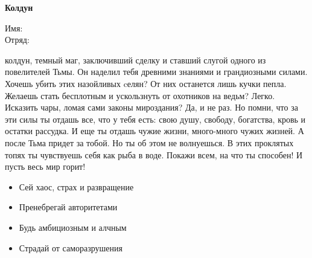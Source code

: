 \documentclass[10pt,twoside]{report}
\begin{document}
\thispagestyle{empty}
\begin{center}
{\LARGE \textbf{Колдун}}


\end{center}
\begin{description}
\item[Имя:]\hfill
\item[Отряд:]\hfill
\end{description}
\pagebreak

{ колдун, темный маг, заключивший сделку и ставший слугой одного из повелителей Тьмы. Он наделил тебя древними знаниями и грандиозными силами. Хочешь убить этих назойливых cелян? От них останется лишь кучки пепла. Желаешь стать бесплотным и ускользнуть от охотников на ведьм? Легко. Исказить чары, ломая сами законы мироздания? Да, и не раз. Но помни, что за эти силы ты отдашь все, что у тебя есть: свою душу, свободу, богатства, кровь и остатки рассудка. И еще ты отдашь чужие жизни, много-много чужих жизней. А после Тьма придет за тобой. Но ты об этом не волнуешься. В этих проклятых топях ты чувствуешь себя как рыба в воде. Покажи всем, на что ты способен! И пусть весь мир горит!}
\begin{itemize}[noitemsep]
  \item Сей хаос, страх и развращение
  \item Пренебрегай авторитетами
  \item Будь амбициозным и алчным
  \item Страдай от саморазрушения
\end{itemize}
\pagebreak

\end{document}

